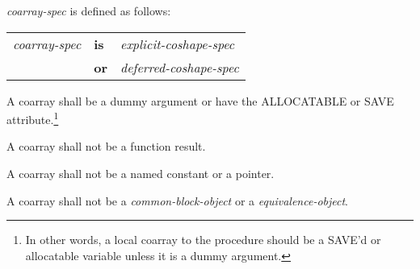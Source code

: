 %
{\it coarray-spec} is defined as follows:
%
\begin{center}
 \begin{tabular}{lll}
  {\it coarray-spec} & {\bf is} & {\it explicit-coshape-spec}\\
                     & {\bf or} & {\it deferred-coshape-spec}\\
 \end{tabular}
\end{center}
%

\begin{Constraints F}
\item A coarray shall be a dummy argument or have the ALLOCATABLE or SAVE 
attribute.\footnote
{In other words, a local coarray to the procedure should be a SAVE'd or allocatable
variable unless it is a dummy argument.}

\item A coarray shall not be a function result.

\item A coarray shall not be a named constant or a pointer. 

\item A coarray shall not be a {\it common-block-object}
or a {\it equivalence-object}.

%
%

\end{Constraints F}

